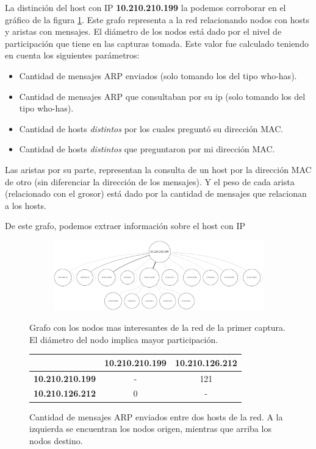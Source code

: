 \par La distinción del host con IP \textbf{10.210.210.199} la podemos corroborar en el gráfico de la figura \ref{fig:exp1_labo_grafo}. Este grafo representa a la red relacionando nodos con hosts y aristas con mensajes. El diámetro de los nodos está dado por el nivel de participación que tiene en las capturas tomada. Este valor fue calculado teniendo en cuenta los siguientes parámetros:
\begin{itemize}
	\item Cantidad de mensajes ARP enviados (solo tomando los del tipo who-has).
	\item Cantidad de mensajes ARP que consultaban por su ip (solo tomando los del tipo who-has).
	\item Cantidad de hosts \textit{distintos} por los cuales preguntó su dirección MAC.
	\item Cantidad de hosts \textit{distintos} que preguntaron por mi dirección MAC.
\end{itemize}
\par Las aristas por su parte, representan la consulta de un host por la dirección MAC de otro (sin diferenciar la dirección de los mensajes). Y el peso de cada arista (relacionado con el grosor) está dado por la cantidad de mensajes que relacionan a los hosts.
\par De este grafo, podemos extraer información sobre el host con IP \textbf{}

\begin{figure}[ht]
  \hspace*{-0.5cm}
  \begin{subfigure}[b]{1.1\textwidth}
    \includegraphics[width=\textwidth]{imagenes/laboratorio/grafo_10.png}
  \end{subfigure}
	\label{fig:exp1_labo_grafo}
	\caption{Grafo con los nodos mas interesantes de la red de la primer captura. El diámetro del nodo implica mayor participación.}
\end{figure}

\begin{figure}[h]
	\begin{tabular}{| c | c | c |}
		\hline
		& \textbf{10.210.210.199} & \textbf{10.210.126.212}  \\ \hline
		\textbf{10.210.210.199} & - & 121 \\ \hline
		\textbf{10.210.126.212} & 0 & - \\ \hline
	\end{tabular}
  \label{fig:exp1_labo_comparativanodos}
  \caption{Cantidad de mensajes ARP enviados entre dos hosts de la red. A la izquierda se encuentran los nodos origen, mientras que arriba los nodos destino.}
\end{figure}

